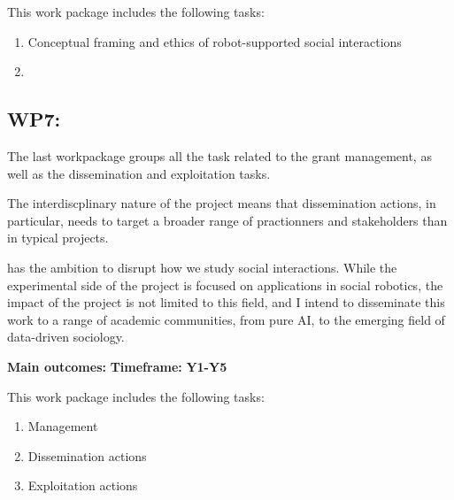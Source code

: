 This work package includes the following tasks:

\begin{enumerate}[label=\textbf{T6.\arabic*}]
    \item Conceptual framing and ethics of robot-supported social
interactions
    \item {}
\end{enumerate}

\subsection{WP7: \textbf{\wpSeven}}

The last workpackage groups all the task related to the grant management, as
well as the dissemination and exploitation tasks.

The interdiscplinary nature of the project means that dissemination actions, in
particular, needs to target a broader range of practionners and stakeholders
than in typical projects.

\project has the ambition to disrupt how we study social interactions. While the
experimental side of the project is focused on applications in social robotics,
the impact of the project is not limited to this field, and I intend to
disseminate this work to a range of academic communities, from pure AI, to the
emerging field of data-driven sociology.


\begin{framed}
    \textbf{Main outcomes:} 
    \textbf{Timeframe:} \textbf{Y1-Y5}
\end{framed}

This work package includes the following tasks:

\begin{enumerate}[label=\textbf{T6.\arabic*}]
    \item Management
    \item Dissemination actions
    \item Exploitation actions
\end{enumerate}


\newpage

\printbibliography



